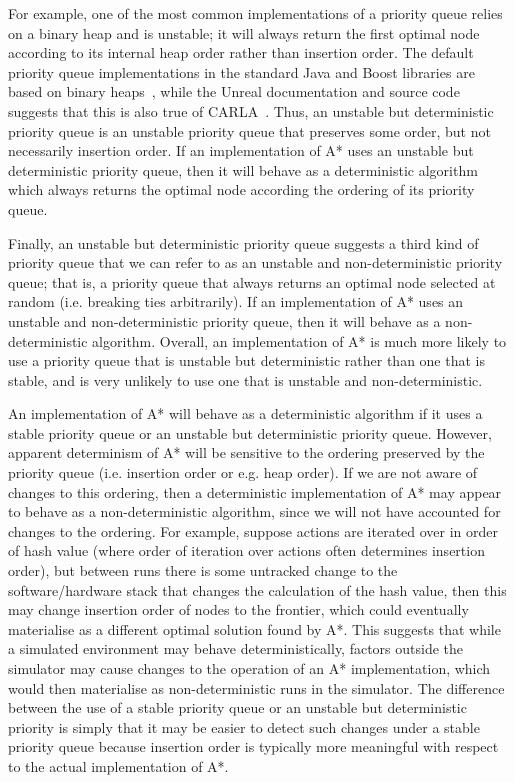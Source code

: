 For example, one of the most common implementations of a priority queue relies on a binary heap and is unstable; it will always return the first optimal node according to its internal heap order rather than insertion order. The default priority queue implementations in the standard Java and Boost libraries are based on binary heaps~\cite{boost2021,priorityQueue}, while the Unreal documentation and source code suggests that this is also true of CARLA~\cite{FGraphAStar,TArray,GraphAStar}. Thus, an unstable but deterministic priority queue is an unstable priority queue that preserves some order, but not necessarily insertion order. If an implementation of A* uses an unstable but deterministic priority queue, then it will behave as a deterministic algorithm which always returns the optimal node according the ordering of its priority queue. 

Finally, an unstable but deterministic priority queue suggests a third kind of priority queue that we can refer to as an unstable and non-deterministic priority queue; that is, a priority queue that always returns an optimal node selected at random (i.e. breaking ties arbitrarily). If an implementation of A* uses an unstable and non-deterministic priority queue, then it will behave as a non-deterministic algorithm. Overall, an implementation of A* is much more likely to use a priority queue that is unstable but deterministic rather than one that is stable, and is very unlikely to use one that is unstable and non-deterministic.

An implementation of A* will behave as a deterministic algorithm if it uses a stable priority queue or an unstable but deterministic priority queue. However, apparent determinism of A* will be sensitive to the ordering preserved by the priority queue (i.e. insertion order or e.g. heap order). If we are not aware of changes to this ordering, then a deterministic implementation of A* may appear to behave as a non-deterministic algorithm, since we will not have accounted for changes to the ordering. For example, suppose actions are iterated over in order of hash value (where order of iteration over actions often determines insertion order), but between runs there is some untracked change to the software/hardware stack that changes the calculation of the hash value, then this may change insertion order of nodes to the frontier, which could eventually materialise as a different optimal solution found by A*. This suggests that while a simulated environment may behave deterministically, factors outside the simulator may cause changes to the operation of an A* implementation, which would then materialise as non-deterministic runs in the simulator. The difference between the use of a stable priority queue or an unstable but deterministic priority is simply that it may be easier to detect such changes under a stable priority queue because insertion order is typically more meaningful with respect to the actual implementation of A*.

